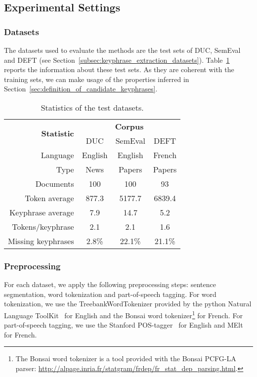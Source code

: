   \subsection{Experimental Settings}
  \label{subsec:evaluation_settings}
    \subsubsection{Datasets}
    \label{subsubsec:datasets}
      The datasets used to evaluate the methods are the test sets of DUC,
      SemEval and DEFT (see Section~\ref{subsec:keyphrase_extraction_datasets}).
      Table~\ref{tab:test_dataset_statistics} reports the information about
      these test sets. As they are coherent with the training sets, we can make
      usage of the properties inferred in
      Section~\ref{sec:definition_of_candidate_keyphrases}.
      \begin{table}
        \centering
        \begin{tabular}{@{~}r@{~}c@{~}c@{~}c@{~}}
          \toprule
          \multirow{2}{*}[-2pt]{\textbf{Statistic}} & \multicolumn{3}{c}{\textbf{Corpus}}\\
          \cmidrule{2-4}
          & DUC & SemEval & DEFT\\
          \midrule
          Language & English & English & French\\
          Type & News & Papers & Papers\\
          Documents & 100 & 100 & 93\\
          Token average & 877.3 & 5177.7 & 6839.4\\
          Keyphrase average & 7.9 & 14.7 & 5.2\\
          Tokens/keyphrase & 2.1 & 2.1 & 1.6\\
          Missing keyphrases & 2.8\% & 22.1\% & 21.1\% \\
          \bottomrule
        \end{tabular}
        \caption{Statistics of the test datasets.
                 \label{tab:test_dataset_statistics}}
      \end{table}

    \subsubsection{Preprocessing}
    \label{subsubsec:preprocessing}
      For each dataset, we apply the following preprocessing steps: sentence
      segmentation, word tokenization and part-of-speech tagging. For word
      tokenization, we use the TreebankWordTokenizer provided by the python
      Natural Language ToolKit~\cite{bird2009nltk} for English and the Bonsai
      word tokenizer\footnote{The Bonsai word tokenizer is a tool provided with
      the Bonsai PCFG-LA parser:
      \url{http://alpage.inria.fr/statgram/frdep/fr_stat_dep_parsing.html}.} for
      French. For part-of-speech tagging, we use the Stanford
      POS-tagger~\cite{toutanova2003stanfordpostagger} for English and
      MElt~\cite{denis2009melt} for French.

